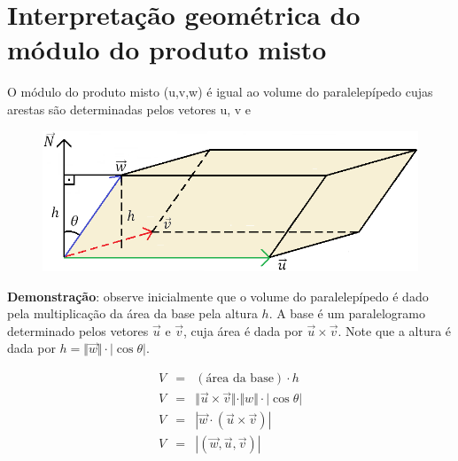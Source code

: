 \section{Interpretação geométrica do módulo do produto misto}

O módulo do produto misto (u,v,w) é igual ao volume do paralelepípedo cujas arestas são determinadas 
pelos vetores  u, v e 

\begin{figure}[H]
\centering
\includegraphics[width=0.4\linewidth]{analitica/imagens/misto.png}
\end{figure}

\textbf{Demonstração}: observe inicialmente que o volume do paralelepípedo é dado pela multiplicação da área da base pela altura $h$. A base é um paralelogramo determinado pelos vetores $\vec u$ e $\vec v$, cuja área é dada por $\vec u \times \vec v$. Note que a altura é dada por $h=\Vert \vec w \Vert \cdot|\cos{\theta}|$.

\begin{eqnarray*}
V & = & (\textrm{área da base})\cdot h \\
V & = & \Vert \vec u \times \vec v\Vert \cdot \Vert w\Vert\cdot |\cos{\theta}|\\
V & = & |\vec w  \cdot ( \vec u \times \vec v)|\\
V & = & |(\vec w, \vec u, \vec v )|
\end{eqnarray*}